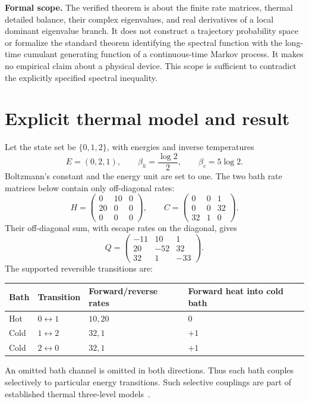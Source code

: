 \documentclass[11pt,a4paper]{article}
\begin{document}
\textbf{Formal scope.} The verified theorem is about the finite rate matrices, thermal detailed balance, their complex eigenvalues, and real derivatives of a local dominant eigenvalue branch. It does not construct a trajectory probability space or formalize the standard theorem identifying the spectral function with the long-time cumulant generating function of a continuous-time Markov process. It makes no empirical claim about a physical device. This scope is sufficient to contradict the explicitly specified spectral inequality.

\section{Explicit thermal model and result}
Let the state set be $\{0,1,2\}$, with energies and inverse temperatures
\begin{equation}
E=(0,2,1),\qquad \beta_h=\frac{\log2}{2},\qquad \beta_c=5\log2.
\label{eq:temperatures}
\end{equation}
Boltzmann's constant and the energy unit are set to one. The two bath rate matrices below contain only off-diagonal rates:
\begin{equation}
H=\begin{pmatrix}0&10&0\\20&0&0\\0&0&0\end{pmatrix},\qquad
C=\begin{pmatrix}0&0&1\\0&0&32\\32&1&0\end{pmatrix}.
\label{eq:baths}
\end{equation}
Their off-diagonal sum, with escape rates on the diagonal, gives
\begin{equation}
Q=\begin{pmatrix}-11&10&1\\20&-52&32\\32&1&-33\end{pmatrix}.
\label{eq:generator}
\end{equation}
The supported reversible transitions are:
\begin{center}
\begin{tabular}{llll}
\toprule
Bath & Transition & Forward/reverse rates & Forward heat into cold bath\\
\midrule
Hot & $0\leftrightarrow1$ & $10,20$ & $0$\\
Cold & $1\leftrightarrow2$ & $32,1$ & $+1$\\
Cold & $2\leftrightarrow0$ & $32,1$ & $+1$\\
\bottomrule
\end{tabular}
\end{center}
An omitted bath channel is omitted in both directions. Thus each bath couples selectively to particular energy transitions. Such selective couplings are part of established thermal three-level models~\cite{segal2018}.
\end{document}
